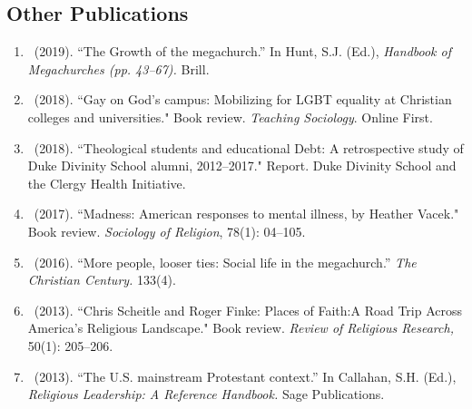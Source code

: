 \subsection*{Other Publications}
\begin{enumerate} 
\item \Eagle\ (2019). ``The Growth of the megachurch.'' In Hunt, S.J. (Ed.), \emph{Handbook of Megachurches (pp. 43--67).} Brill.

\item \Eagle\  (2018). ``Gay on God’s campus: Mobilizing for LGBT equality at Christian colleges and universities." Book review. \emph{Teaching Sociology}. Online First. 

\item \Eagle\ (2018). ``Theological students and educational Debt: A retrospective study of Duke Divinity School alumni, 2012--2017." Report. Duke Divinity School and the Clergy Health Initiative.

\item \Eagle\ (2017). ``Madness: American responses to mental illness, by Heather Vacek." Book review. \emph{Sociology of Religion}, 78(1): 04--105. 

\item \Eagle\ (2016). ``More people, looser ties: Social life in the megachurch.'' \emph{The Christian Century.} 133(4).

\item \Eagle\ (2013). ``Chris Scheitle and Roger Finke: Places of Faith:A Road Trip Across America's Religious Landscape." Book review.  \emph{Review of Religious Research,} 50(1): 205--206.

\item \Eagle\ (2013). ``The U.S. mainstream Protestant context.'' In Callahan, S.H. (Ed.), \emph{Religious Leadership: A Reference Handbook.} Sage Publications.
\end{enumerate}